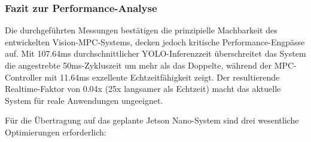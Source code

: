 \subsubsection{Fazit zur Performance-Analyse} \label{sec:performance-analysis-conclusion}

Die durchgeführten Messungen bestätigen die prinzipielle Machbarkeit des entwickelten Vision-MPC-Systems, decken jedoch kritische Performance-Engpässe auf. Mit 107.64ms durchschnittlicher YOLO-Inferenzzeit überschreitet das System die angestrebte 50ms-Zykluszeit um mehr als das Doppelte, während der MPC-Controller mit 11.64ms exzellente Echtzeitfähigkeit zeigt. Der resultierende Realtime-Faktor von 0.04x (25x langsamer als Echtzeit) macht das aktuelle System für reale Anwendungen ungeeignet.



Für die Übertragung auf das geplante Jetson Nano-System sind drei wesentliche Optimierungen erforderlich:

